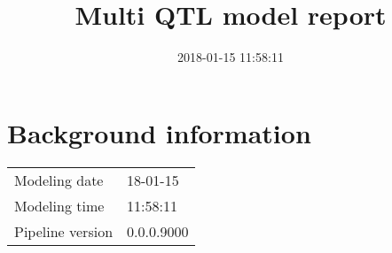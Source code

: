 \documentclass[a4paper,11pt]{article}\usepackage[]{graphicx}\usepackage[]{color}
\title{Multi QTL model report}%
\author{\vspace{-5ex}}
\date{2018-01-15 11:58:11}
\begin{document}


\maketitle
\singlespacing

\section{Background information}
\begin{table}[ht]
\begin{flushleft}
\begin{tabular}{ll}
  Modeling date & 18-01-15 \\ 
  Modeling time & 11:58:11 \\ 
  Pipeline version & 0.0.0.9000 \\ 
  \end{tabular}
\label{background}
\end{flushleft}
\end{table}


\end{document}
